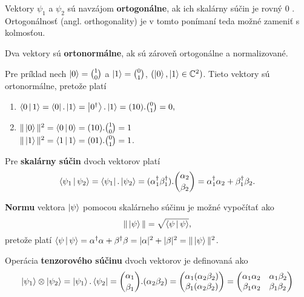Vektory \(\psi_1\) a \(\psi_2\) sú navzájom \textbf{ortogonálne}, ak ich skalárny súčin je rovný 0 \cite{Ber18}. Ortogonálnosť (angl. orthogonality) je v tomto ponímaní teda možné zameniť s kolmosťou.

Dva vektory sú \textbf{ortonormálne}, ak sú zároveň ortogonálne a normalizované.

Pre príklad nech \(\Ket{0} = \binom{1}{0}\) a \(\Ket{1} = \binom{0}{1}\), \( (\Ket{0}, \Ket{1} \in \mathbb{C}^2) \).
Tieto vektory sú ortonormálne, pretože platí 
\begin{enumerate}
\item \(\Braket{0|1} = \Bra{0} . \Ket{1} = \Ket{0^{\dag}} . \Ket{1} = (1 0) . \binom{0}{1} = 0,\)
\item \(\Vert \Ket{0} \Vert^2 = \Braket{0|0} = (1 0) . \binom{1}{0} = 1\) \\
\(\Vert \Ket{1} \Vert^2 = \Braket{1|1} = (0 1) . \binom{0}{1} = 1\).
\end{enumerate}

Pre \textbf{skalárny súčin} dvoch vektorov platí
\[\Braket{\psi_1|\psi_2} = \Bra{\psi_1} . \Ket{\psi_2} = (\alpha_1^{\dag}\beta_1^{\dag}) . \binom{\alpha_2}{\beta_2} = \alpha_1^{\dag}\alpha_2 + \beta_1^{\dag}\beta_2.\]

\textbf{Normu} vektora \cite{Ber18}  \(\Ket{\psi}\) pomocou skalárneho súčinu je možné vypočítať ako
\[\Vert \Ket{\psi} \Vert = \sqrt{\Braket{\psi|\psi}},\]
pretože platí \(\Braket{\psi|\psi} = \alpha^{\dag}\alpha + \beta^{\dag}\beta = |\alpha|^2 + |\beta|^2 = \Vert \Ket{\psi} \Vert^2\).

Operácia \textbf{tenzorového súčinu} dvoch vektorov \cite{Hun03} je definovaná 
ako
\[
\Ket{\psi_1} \otimes \Ket{\psi_2} = \Ket{\psi_1} . \Bra{\psi_2} = \binom{\alpha_1}{\beta_1} . (\alpha_2\beta_2) = 
\begin{pmatrix}
	\alpha_1(\alpha_2\beta_2) \\ 
	\beta_1(\alpha_2\beta_2)
\end{pmatrix} = 
\begin{pmatrix}
	\alpha_1\alpha_2 \quad \alpha_1\beta_2 \\
	\beta_1\alpha_2 \quad \beta_1\beta_2
\end{pmatrix}
\]
